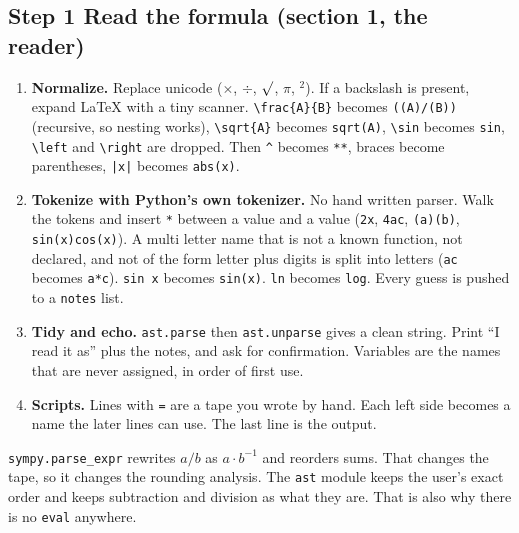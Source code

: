 \documentclass[11pt]{article}
\begin{document}
\subsection*{Step 1 \quad Read the formula (section 1, the reader)}
\begin{enumerate}
\item \textbf{Normalize.} Replace unicode ($\times$, $\div$, $\surd$, $\pi$, $^2$). If a backslash is present, expand LaTeX with a tiny scanner. \verb|\frac{A}{B}| becomes \verb|((A)/(B))| (recursive, so nesting works), \verb|\sqrt{A}| becomes \verb|sqrt(A)|, \verb|\sin| becomes \verb|sin|, \verb|\left| and \verb|\right| are dropped. Then \verb|^| becomes \verb|**|, braces become parentheses, \verb/|x|/ becomes \verb|abs(x)|.
\item \textbf{Tokenize with Python's own tokenizer.} No hand written parser. Walk the tokens and insert \verb|*| between a value and a value (\verb|2x|, \verb|4ac|, \verb|(a)(b)|, \verb|sin(x)cos(x)|). A multi letter name that is not a known function, not declared, and not of the form letter plus digits is split into letters (\verb|ac| becomes \verb|a*c|). \verb|sin x| becomes \verb|sin(x)|. \verb|ln| becomes \verb|log|. Every guess is pushed to a \texttt{notes} list.
\item \textbf{Tidy and echo.} \verb|ast.parse| then \verb|ast.unparse| gives a clean string. Print ``I read it as'' plus the notes, and ask for confirmation. Variables are the names that are never assigned, in order of first use.
\item \textbf{Scripts.} Lines with \verb|=| are a tape you wrote by hand. Each left side becomes a name the later lines can use. The last line is the output.
\end{enumerate}

\begin{trap}
\texttt{sympy.parse\_expr} rewrites $a/b$ as $a\cdot b^{-1}$ and reorders sums. That changes the tape, so it changes the rounding analysis. The \texttt{ast} module keeps the user's exact order and keeps subtraction and division as what they are. That is also why there is no \texttt{eval} anywhere.
\end{trap}
\end{document}
